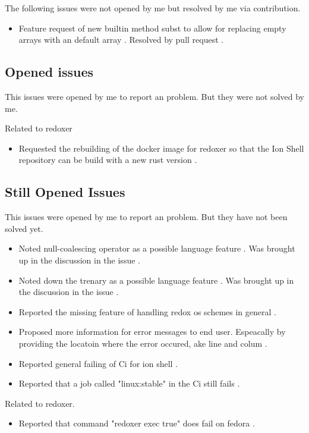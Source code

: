 The following issues were not opened by me but resolved by me via contribution.

\begin{itemize}
	\item Feature request of new builtin method subst to allow for replacing empty arrays with an default array \cite{issue_subst_request}. Resolved by pull request \cite{pr_subst_method}.

\end{itemize}

\subsection{Opened issues}

This issues were opened by me to report an problem. But they were not solved by me.

Related to \gls{redoxer}

\begin{itemize}
	\item Requested the rebuilding of the docker image for \gls{redoxer} so that the Ion Shell repository can be build with a new rust version \cite{issue_request_new_docker_version}.
\end{itemize}

\subsection{Still Opened Issues}

This issues were opened by me to report an problem. But they have not been solved yet.

\begin{itemize}
	\item Noted null-coalescing operator as a possible language feature \cite{issue_null_coalescing_operator}. Was brought up in the discussion in the issue \cite{pr_subst_method}.
	\item Noted down the trenary as a possible language feature \cite{issue_ternary_operator_arrays_strings}. Was brought up in the discussion in the issue \cite{pr_subst_method}.
	\item Reported the missing feature of handling redox os schemes in general \cite{issue_disk_scheme}.
	\item Proposed more information for error messages to end user. Espeacally by providing the locatoin where the error occured, ake line and colum \cite{issue_enrich_error_message_information}.
	\item Reported general failing of Ci for ion shell \cite{issue_failing_ci}.
	\item Reported that a job called "linux:stable" in the Ci still fails \cite{issue_ci_linux_stable_fail}.
\end{itemize}

Related to \gls{redoxer}.

\begin{itemize}
	\item Reported that command "redoxer exec true" does fail on fedora \cite{issue_redoxer_exec_true}.
\end{itemize}



